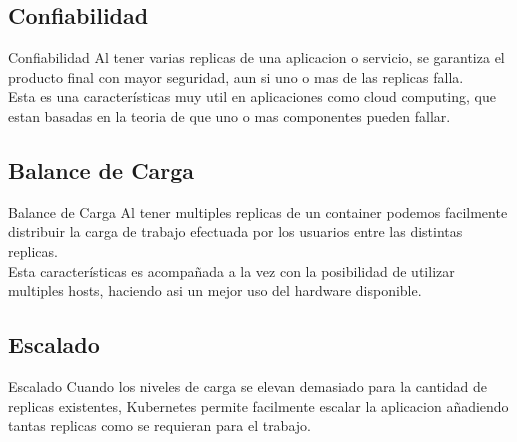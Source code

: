 \documentclass{beamer}
\begin{document}
\subsection{Confiabilidad}

\begin{frame}{Confiabilidad}
	Al tener varias replicas de una aplicacion o servicio, se garantiza el producto final con mayor seguridad, aun si uno o mas de las replicas falla. \\
	\vspace{.3cm}
	Esta es una características muy util en aplicaciones como cloud computing, que estan basadas en la teoria de que uno o mas componentes pueden fallar.
\end{frame}


\subsection{Balance de Carga}

\begin{frame}{Balance de Carga}
	Al tener multiples replicas de un container podemos facilmente distribuir la carga de trabajo efectuada por los usuarios entre las distintas replicas. \\
	\vspace{.3cm}
	Esta características es acompañada a la vez con la posibilidad de utilizar multiples hosts, haciendo asi un mejor uso del hardware disponible.
\end{frame}


\subsection{Escalado}

\begin{frame}{Escalado}
	\hspace{.3cm}Cuando los niveles de carga se elevan demasiado para la cantidad de replicas existentes, Kubernetes permite facilmente escalar la aplicacion
	añadiendo tantas replicas como se requieran para el trabajo.
\end{frame}
\end{document}
